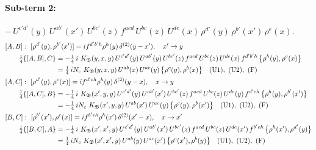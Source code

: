 \documentclass[10pt]{article}
\numberwithin{equation}{section}
\begin{document}
\paragraph{Sub-term 2:} $-\,U^{c'd'}(y)\,U^{ab'}(x')\,U^{bc'}(z)\,f^{acd}\,U^{bc}(z)\,U^{de}(x)\,\rho^{d'}(y)\,\rho^{b'}(x')\,\rho^{e}(x)$.
\begin{align}
&[A,B]:\ [\rho^{d'}(y),\rho^{b'}(x')]=i f^{d'b'h}\rho^{h}(y)\,\delta^{(2)}(y-x'),\quad x'\to y\notag\\
&\qquad \tfrac14\{[A,B],C\}=-\tfrac14\,i\,\,K_{\mathfrak B}(y,x,y)\,U^{c'd'}(y)\,U^{ab'}(y)\,U^{bc'}(z)\,f^{acd}\,U^{bc}(z)\,U^{de}(x)\,f^{d'b'h}\,\big\{\rho^{h}(y),\rho^{e}(x)\big\}\notag\\
&\qquad\phantom{\tfrac14\{[A,B],C\}}=\tfrac14\,i N_{c}\,\,K_{\mathfrak B}(y,x,y)\,U^{ab}(x)\,U^{ac}(y)\,\big\{\rho^{c}(y),\rho^{b}(x)\big\}\quad\text{(U1)},\ \text{(U2)},\ \text{(F)}
\label{R:eq:GIII.II-2-AB}\\
&[A,C]:\ [\rho^{d'}(y),\rho^{e}(x)]=i f^{d'eh}\rho^{h}(y)\,\delta^{(2)}(y-x),\quad x\to y\notag\\
&\qquad \tfrac14\{[A,C],B\}=-\tfrac14\,i\,\,K_{\mathfrak B}(x',y,y)\,U^{c'd'}(y)\,U^{ab'}(x')\,U^{bc'}(z)\,f^{acd}\,U^{bc}(z)\,U^{de}(y)\,f^{d'eh}\,\big\{\rho^{h}(y),\rho^{b'}(x')\big\}\notag\\
&\qquad\phantom{\tfrac14\{[A,C],B\}}=-\tfrac14\,i N_{c}\,\,K_{\mathfrak B}(x',y,y)\,U^{ab}(x')\,U^{ac}(y)\,\big\{\rho^{c}(y),\rho^{b}(x')\big\}\quad\text{(U1)},\ \text{(U2)},\ \text{(F)}
\label{R:eq:GIII.II-2-AC}\\
&[B,C]:\ [\rho^{b'}(x'),\rho^{e}(x)]=i f^{b'eh}\rho^{h}(x')\,\delta^{(2)}(x'-x),\quad x\to x'\notag\\
&\qquad \tfrac14\{[B,C],A\}=-\tfrac14\,i\,\,K_{\mathfrak B}(x',x',y)\,U^{c'd'}(y)\,U^{ab'}(x')\,U^{bc'}(z)\,f^{acd}\,U^{bc}(z)\,U^{de}(x')\,f^{b'eh}\,\big\{\rho^{h}(x'),\rho^{d'}(y)\big\}\notag\\
&\qquad\phantom{\tfrac14\{[B,C],A\}}=\tfrac14\,i N_{c}\,\,K_{\mathfrak B}(x',x',y)\,U^{ab}(y)\,U^{ac}(x')\,\big\{\rho^{c}(x'),\rho^{b}(y)\big\}\quad\text{(U1)},\ \text{(U2)},\ \text{(F)}
\label{R:eq:GIII.II-2-BC}
\end{align}
\end{document}
